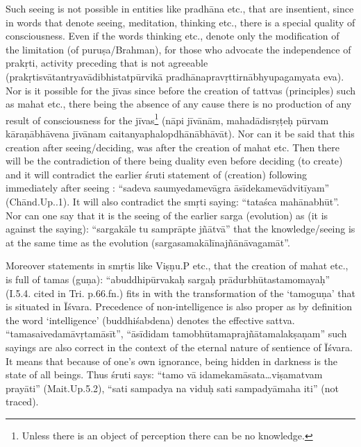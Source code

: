 Such seeing is not possible in entities like pradhāna etc., that are insentient, since in words that denote seeing, meditation, thinking etc., there is a special quality of consciousness. Even if the words thinking etc., denote only the modification of the limitation (of puruṣa/Brah\-man), for those who advocate the independence of prakṛti, activity preceding that is not agreeable (prakṛtisvātantryavādibhistatpūrvikā pradhānapravṛttirnābhyupagamyata eva). Nor is it possible for the jīvas since before the creation of tattvas (principles) such as mahat etc., there being the absence of any cause there is no production of any result of consciousness for the jīvas\footnote{Unless there is an object of perception there can be no knowledge.} (nāpi jīvānām, mahadādisrṣṭeḥ pūrvam kāraṇābhāvena jīvānam caitanyaphalopdhānābhāvāt). Nor can it be said that this creation after seeing/deciding, was after the creation of mahat etc. Then there will be the contradiction of there being duality even before deciding (to create) and it will contradict the earlier śruti statement of (creation) following immediately after seeing : “sadeva saumyedamevāgra āsīdekamevādvitīyam” (Chānd.Up..1). It will also contradict the smṛti saying: “tataśca mahānabhūt”. Nor can one say that it is the seeing of the earlier sarga (evolution) as (it is against the saying): “sargakāle tu samprāpte jñātvā” that the knowledge/seeing is at the same time as the evolution (sargasamakālīnajñānāvagamāt”.

Moreover statements in smṛtis like Viṣṇu.P etc., that the creation of mahat etc., is full of tamas (guṇa): “abuddhipūrvakaḥ sargaḥ prādurbhūtastamomayaḥ” (I.5.4. cited in Tri. p.66.fn.) fits in with the transformation of the ‘tamoguṇa’ that is situated in Īśvara. Precedence of non-intelligence is also proper as by definition the word ‘intelligence’ (buddhiśabdena) denotes the effective sattva. “tamasaivedamāvṛta\-māsīt”, “āsīdidam tamobhūtamaprajñātamalakṣaṇam” such sayings are also correct in the context of the eternal nature of sentience of Īśvara. It means that because of one’s own ignorance, being hidden in darkness is the state of all beings. Thus śruti says: “tamo vā idamekamāsata\-…viṣamatvam prayāti” (Mait.Up.5.2), “sati sampadya na viduḥ sati sampadyāmaha iti” (not traced).


